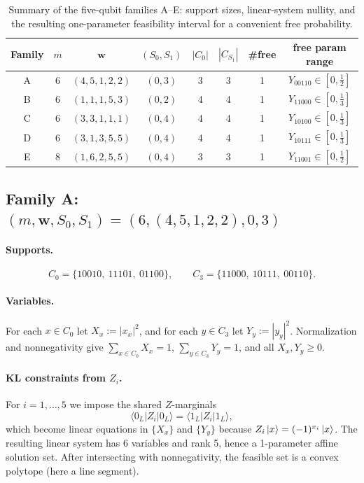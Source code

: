 \documentclass[11pt]{article}
\begin{document}
\begin{table}[h]
\centering
\begin{tabular}{c|c|c|c|c|c|c|c}
Family & $m$ & $\mathbf w$ & $(S_0,S_1)$ & $|C_0|$ & $|C_{S_1}|$ & \#free & free param range \\
\hline
A & 6 & $(4,5,1,2,2)$ & $(0,3)$ & 3 & 3 & 1 & $Y_{00110}\in[0,\frac{1}{2}]$ \\
B & 6 & $(1,1,1,5,3)$ & $(0,2)$ & 4 & 4 & 1 & $Y_{11000}\in[0,\frac{1}{3}]$ \\
C & 6 & $(3,3,1,1,1)$ & $(0,4)$ & 4 & 4 & 1 & $Y_{10100}\in[0,\frac{1}{3}]$ \\
D & 6 & $(3,1,3,5,5)$ & $(0,4)$ & 4 & 4 & 1 & $Y_{10111}\in[0,\frac{1}{3}]$ \\
E & 8 & $(1,6,2,5,5)$ & $(0,4)$ & 3 & 3 & 1 & $Y_{11001}\in[0,\frac{1}{2}]$ \\
\end{tabular}
\caption{Summary of the five-qubit families A--E: support sizes, linear-system nullity, and the resulting one-parameter feasibility interval for a convenient free probability.}
\end{table}

\subsection{Family A: $(m,\mathbf w,S_0,S_1)=(6,(4,5,1,2,2),0,3)$}

\paragraph{Supports.}
\[
C_0 = \{10010,\ 11101,\ 01100\},\qquad C_3 = \{11000,\ 10111,\ 00110\}.
\]

\paragraph{Variables.}
For each $x\in C_0$ let $X_x:=|x_x|^2$, and for each $y\in C_3$ let $Y_y:=|y_y|^2$.
Normalization and nonnegativity give $\sum_{x\in C_0}X_x=1$, $\sum_{y\in C_3}Y_y=1$, and all $X_x,Y_y\ge 0$.

\paragraph{KL constraints from $Z_i$.}
For $i=1,\dots,5$ we impose the shared $Z$-marginals
\[
\langle 0_L|Z_i|0_L\rangle=\langle 1_L|Z_i|1_L\rangle,
\]
which become linear equations in $\{X_x\}$ and $\{Y_y\}$ because $Z_i\ket{x}=(-1)^{x_i}\ket{x}$.
The resulting linear system has 6 variables and rank 5, hence a 1-parameter affine solution set. After intersecting with nonnegativity, the feasible set is a convex polytope (here a line segment).
\end{document}
